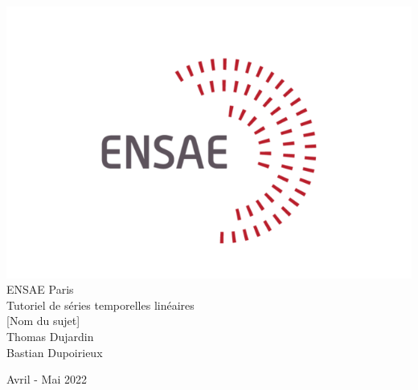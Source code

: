 \documentclass[a4paper, 12pt]{article} %
\begin{document}
\renewcommand*\contentsname{Sommaire}

\begin{titlepage}

\centering

	\includegraphics[scale = 0.5]{logo.png} 
	\\
		\vspace{1 cm}
	\LARGE{ENSAE Paris}
		\\ 
		\vspace{2 cm}
	\Large{Tutoriel de séries temporelles linéaires}
		\\
		\vspace{2.5 cm}
	\Huge{[Nom du sujet]}
		\\
		\vspace{2 cm}
	\Large{Thomas Dujardin}
	\\
	\vspace{1cm}
	\Large{Bastian Dupoirieux}

	\vfill
	{\large{Avril - Mai 2022}}

\end{titlepage}
\end{document}
